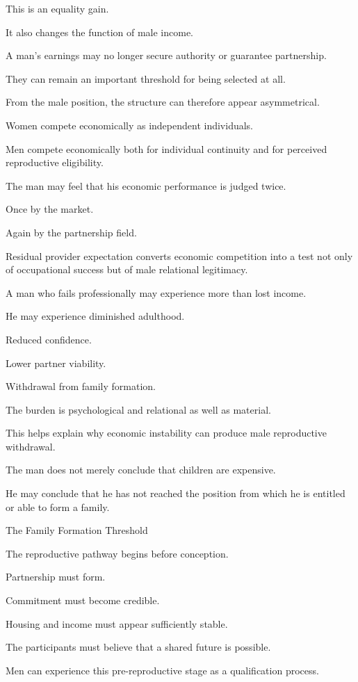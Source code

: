 This is an equality gain.

It also changes the function of male income.

A man’s earnings may no longer secure authority or guarantee partnership.

They can remain an important threshold for being selected at all.

From the male position, the structure can therefore appear asymmetrical.

Women compete economically as independent individuals.

Men compete economically both for individual continuity and for perceived reproductive eligibility.

The man may feel that his economic performance is judged twice.

Once by the market.

Again by the partnership field.

Residual provider expectation converts economic competition into a test not only of occupational success but of male relational legitimacy.

A man who fails professionally may experience more than lost income.

He may experience diminished adulthood.

Reduced confidence.

Lower partner viability.

Withdrawal from family formation.

The burden is psychological and relational as well as material.

This helps explain why economic instability can produce male reproductive withdrawal.

The man does not merely conclude that children are expensive.

He may conclude that he has not reached the position from which he is entitled or able to form a family.

The Family Formation Threshold

The reproductive pathway begins before conception.

Partnership must form.

Commitment must become credible.

Housing and income must appear sufficiently stable.

The participants must believe that a shared future is possible.

Men can experience this pre-reproductive stage as a qualification process.

